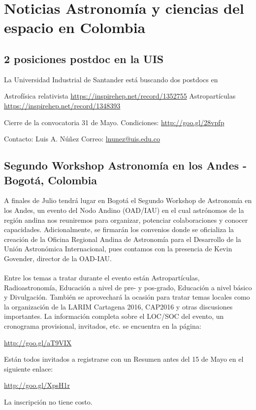 \documentclass{book}
\begin{document}
\newcommand{\theimage}{fig22.jpg}
 
\tableofcontents{}

\section*{Noticias Astronomía y ciencias del espacio en Colombia}
\subsection{2 posiciones postdoc en la UIS}
La Universidad Industrial de Santander está buscando dos postdocs en

Astrofísica relativista \url{https://inspirehep.net/record/1352755}
Astropartículas \url{https://inspirehep.net/record/1348393}

Cierre de la convocatoria 31 de Mayo. 
Condiciones: \url{http://goo.gl/28vpfp}

Contacto: Luis A. Núñez 
Correo: \url{lnunez@uis.edu.co}


\subsection{Segundo Workshop Astronomía en los Andes - Bogotá, Colombia}


A finales de Julio tendrá lugar en Bogotá el Segundo Workshop de Astronomía en los Andes, un evento del Nodo Andino (OAD/IAU) en el cual astrónomos de la región andina nos reuniremos para organizar, potenciar colaboraciones y conocer capacidades. Adicionalmente, se firmarán los convenios donde se oficializa la creación de la Oficina Regional Andina de Astronomía para el Desarrollo de la Unión Astronómica Internacional, pues contamos con la presencia de Kevin Govender, director de la OAD-IAU. \\
\\
Entre los temas a tratar durante el evento están Astropartículas, Radioastronomía, Educación a nivel de pre- y pos-grado, Educación a nivel básico y Divulgación. También se aprovechará la ocasión para tratar temas locales como la organización de la LARIM Cartagena 2016, CAP2016 y otras discusiones importantes. La información completa sobre el LOC/SOC del evento, un cronograma provisional, invitados, etc. se encuentra en la página:
\begin{center}
\url{http://goo.gl/aT9VIX}
\end{center}
Están todos invitados a registrarse con un Resumen antes del 15 de Mayo en el siguiente enlace:
\begin{center}
\url{http://goo.gl/XpsH1r}
\end{center}
La inscripción no tiene costo.
\end{document}
